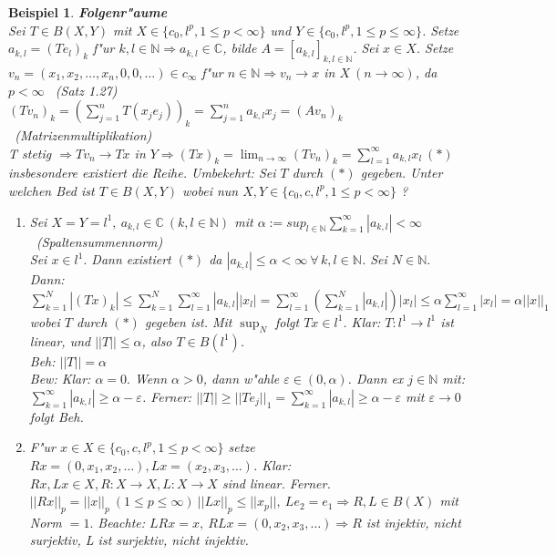 \documentclass[a4paper,11pt]{book}
\newcommand{\C}{{\mathbb C}}
\newcommand{\N}{{\mathbb N}}
\newcommand{\eps}{{\varepsilon}}
\newtheorem{Bsp}[Def]{Beispiel}
\theoremstyle{nonumberplain}
\begin{document}
\begin{Bsp}
\textbf{Folgenr"aume}\\
Sei $T \in B(X,Y)$ mit $X \in \{ c_0, l^p, 1 \leq p < \infty \}$ und $Y \in \{ c_0, l^p, 1 \leq p \leq \infty \}$. Setze $a_{k,l} = (Te_l)_k$ f"ur $k,l \in \N \Rightarrow a_{k,l} \in \C$, bilde $A = [a_{k,l}]_{k,l \in \N}$. Sei $x \in X$. Setze $v_n = (x_1,x_2,\dots,x_n,0,0,\dots) \in c_{\infty}$ f"ur $n \in \N \Rightarrow v_n \rightarrow x$ in $X \ (n \rightarrow \infty)$, da $p < \infty$ \ (Satz 1.27)\\
$(Tv_n)_k = (\sum_{j=1}^n T(x_j e_j))_k = \sum_{j=1}^n a_{k,l} x_j = (Av_n)_k$ \ (Matrizenmultiplikation)\\
T stetig $\Rightarrow Tv_n \rightarrow Tx$ in $Y \Rightarrow (Tx)_k = \lim_{n \rightarrow \infty} (Tv_n)_k = \sum_{l=1}^{\infty} a_{k,l} x_l \ (\ast)$ insbesondere existiert die Reihe. Umbekehrt: Sei $T$ durch $(\ast)$ gegeben. Unter welchen Bed ist $T \in B(X,Y)$ wobei nun $X,Y \in \{c_0,c,l^p,1 \leq p < \infty\}$ ?
\begin{enumerate}
\item[a)] Sei $X = Y = l^1,\ a_{k,l} \in \C \ (k,l \in \N)$ mit $\alpha := sup_{l \in \N} \sum_{k=1}^{\infty} |a_{k,l}| < \infty$ \ (Spaltensummennorm)\\
Sei $x \in l^1.$ Dann existiert $(\ast)$ da $|a_{k,l}| \leq \alpha < \infty \ \forall\, k,l \in \N$. Sei $N \in \N.$ Dann: $\sum_{k=1}^N |(Tx)_k| \leq \sum_{k=1}^N \sum_{l=1}^{\infty} |a_{k,l}| |x_l| = \sum_{l=1}^{\infty} (\sum_{k=1}^N |a_{k,l}|)|x_l| \leq \alpha \sum_{l=1}^{\infty} |x_l| = \alpha ||x||_1$ wobei $T$ durch $(\ast)$ gegeben ist. Mit $\sup_N$ folgt $Tx \in l^1$. Klar: $T:l^1 \rightarrow l^1$ ist linear, und $||T|| \leq \alpha$, also $T \in B(l^1)$.\\
\emph{Beh:} $||T|| = \alpha$\\
\emph{Bew:} Klar: $\alpha = 0.$  Wenn $\alpha > 0$, dann w"ahle $\eps \in (0,\alpha)$. Dann ex $j \in \N$ mit: $\sum_{k=1}^{\infty} |a_{k,l}| \geq \alpha - \eps$. Ferner: $||T|| \geq ||Te_j||_1 = \sum_{k=1}^{\infty} |a_{k,l}| \geq \alpha - \eps$ mit $\eps \rightarrow 0$ folgt Beh.
\item[b)] F"ur $x \in X \in \{ c_0,c,l^p,1\leq p < \infty\}$ setze $Rx = (0,x_1,x_2,\dots), Lx = (x_2,x_3,\dots)$. Klar: $Rx,Lx \in X, R:X \rightarrow X, L:X \rightarrow X$ sind linear. Ferner. $||Rx||_p = ||x||_p \ (1 \leq p \leq \infty) \ ||Lx||_p \leq ||x_p||,\ Le_2 = e_1 \Rightarrow R,L \in B(X)$ mit Norm $=1.$ Beachte: $LRx = x,\ RLx = (0,x_2,x_3,\dots) \Rightarrow R$ ist injektiv, nicht surjektiv, L ist surjektiv, nicht injektiv.\\

\end{enumerate}
\end{Bsp}
\end{document}
